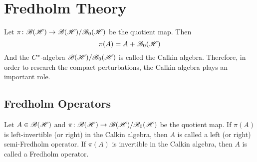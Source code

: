 \section{Fredholm Theory}

Let $\pi \colon \mathscr{B(H)} \rightarrow \mathscr{B(H)} / \mathscr{B}_{0}\mathscr{(H)}$ be the quotient map. Then 
\begin{equation*}
	\pi(A) = A + \mathscr{B}_{0}\mathscr{(H)}
\end{equation*}
And the $C^{*}$-algebra $\mathscr{B(H)} / \mathscr{B}_{0}\mathscr{(H)}$ is called the Calkin algebra. Therefore, in order to research the compact perturbations, the Calkin algebra plays an important role. 

\subsection{Fredholm Operators}

\begin{defn}
	Let $A \in \mathscr{B(H)}$ and $\pi \colon \mathscr{B(H)} \rightarrow \mathscr{B(H)} / \mathscr{B}_{0}\mathscr{(H)}$ be the quotient map. If $\pi(A)$ is left-invertible (or right) in the Calkin algebra, then $A$ is called a left (or right) semi-Fredholm operator. If $\pi(A)$ is invertible in the Calkin algebra, then $A$ is called a Fredholm operator.
\end{defn}

